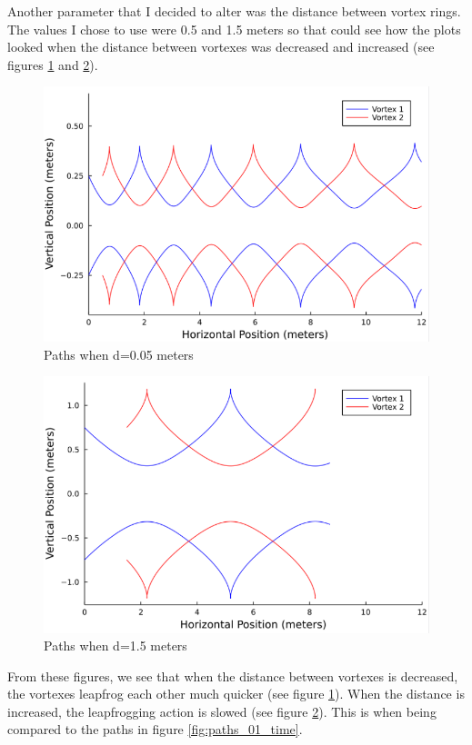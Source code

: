 \documentclass{article}
\begin{document}
Another parameter that I decided to alter was the distance between vortex rings. The values I chose to use were 0.5 and 1.5 meters so that could see how the plots looked when the distance between vortexes was decreased and increased (see figures \ref{fig:paths_.05_distance} and \ref{fig:paths_1.5_distance}).

\begin{figure}[ht]
\centering
\includegraphics[scale=0.75]{plots_.05.1.4000.01.png}
\caption{Paths when d=0.05 meters}
\label{fig:paths_.05_distance}
\end{figure}

\begin{figure}[ht]
\centering
\includegraphics[scale=0.75]{plots_1.5.1.4000.01.png}
\caption{Paths when d=1.5 meters}
\label{fig:paths_1.5_distance}
\end{figure}

From these figures, we see that when the distance between vortexes is decreased, the vortexes leapfrog each other much quicker (see figure \ref{fig:paths_.05_distance}). When the distance is increased, the leapfrogging action is slowed (see figure \ref{fig:paths_1.5_distance}). This is when being compared to the paths in figure \ref{fig:paths_01_time}.
\end{document}
